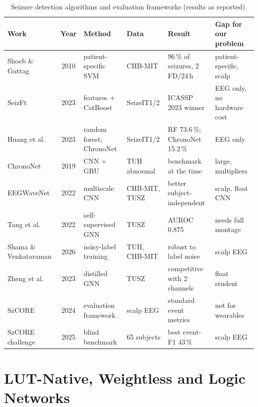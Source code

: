 \begin{table}[htbp]
\centering\small
\caption{Seizure detection algorithms and evaluation frameworks (results as reported).}\label{tab:lit-alg}
\begin{tabularx}{\textwidth}{@{}P{30mm}cP{25mm}P{20mm}LL@{}}
\toprule
\textbf{Work} & \textbf{Year} & \textbf{Method} & \textbf{Data} & \textbf{Result} & \textbf{Gap for our problem}\\
\midrule
Shoeb \& Guttag \cite{shoeb2010icml} & 2010 & patient-specific SVM & CHB-MIT & 96\,\% of seizures, 2 FD/24\,h & patient-specific, scalp\\
SeizFt \cite{alhussaini2023seizft} & 2023 & features + CatBoost & SeizeIT1/2 & ICASSP 2023 winner & EEG only, no hardware cost\\
Huang et al. \cite{huang2023lightweight} & 2023 & random forest; ChronoNet & SeizeIT1/2 & RF 73.6\,\%; ChronoNet 15.2\,\% & EEG only\\
ChronoNet \cite{roy2019chrononet} & 2019 & CNN + GRU & TUH abnormal & benchmark at the time & large, multipliers\\
EEGWaveNet \cite{thuwajit2022eegwavenet} & 2022 & multiscale CNN & CHB-MIT, TUSZ & better subject-independent & scalp, float CNN\\
Tang et al. \cite{tang2022gnnssl} & 2022 & self-supervised GNN & TUSZ & AUROC 0.875 & needs full montage\\
Shama \& Venkataraman \cite{shama2026bundl} & 2026 & noisy-label training & TUH, CHB-MIT & robust to label noise & scalp EEG\\
Zheng et al. \cite{zheng2023kdgnn} & 2023 & distilled GNN & TUSZ & competitive with 2 channels & float student\\
SzCORE \cite{dan2024szcore} & 2024 & evaluation framework & scalp EEG & standard event metrics & not for wearables\\
SzCORE challenge \cite{dan2025szcorechallenge} & 2025 & blind benchmark & 65 subjects & best event-F1 43\,\% & scalp EEG\\
\bottomrule
\end{tabularx}
\end{table}

\section{LUT-Native, Weightless and Logic Networks}\label{sec:lit-lut}

